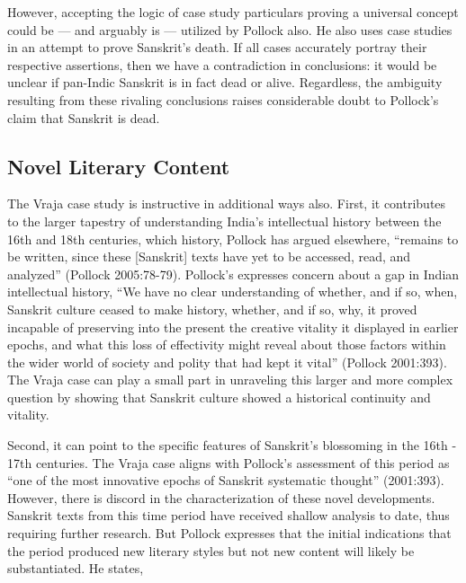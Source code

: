 However, accepting the logic of case study particulars proving a universal concept could be — and arguably is — utilized by Pollock also. He also uses case studies in an attempt to prove Sanskrit’s death. If all cases accurately portray their respective assertions, then we have a contradiction in conclusions: it would be unclear if pan-Indic Sanskrit is in fact dead or alive. Regardless, the ambiguity resulting from these rivaling conclusions raises considerable doubt to Pollock’s claim that Sanskrit is dead. 

\subsection*{Novel Literary Content}

The Vraja case study is instructive in additional ways also. First, it contributes to the larger tapestry of understanding India’s intellectual history between the 16th and 18th centuries, which history, Pollock has argued elsewhere, “remains to be written, since these [Sanskrit] texts have yet to be accessed, read, and analyzed” (Pollock 2005:78-79). Pollock’s expresses concern about a gap in Indian intellectual history, “We have no clear understanding of whether, and if so, when, Sanskrit culture ceased to make history, whether, and if so, why, it proved incapable of preserving into the present the creative vitality it displayed in earlier epochs, and what this loss of effectivity might reveal about those factors within the wider world of society and polity that had kept it vital” (Pollock 2001:393). The Vraja case can play a small part in unraveling this larger and more complex question by showing that Sanskrit culture showed a historical continuity and vitality. 
\vskip 2pt

Second, it can point to the specific features of Sanskrit’s blossoming in the 16th - 17th centuries. The Vraja case aligns with Pollock’s assessment of this period as “one of the most innovative epochs of Sanskrit systematic thought” (2001:393). However, there is discord in the characterization of these novel developments. Sanskrit texts from this time period have received shallow analysis to date, thus requiring further research. But Pollock expresses that the initial indications that the period produced new literary styles but not new content will likely be substantiated. He states, 
\vskip 2.5pt

